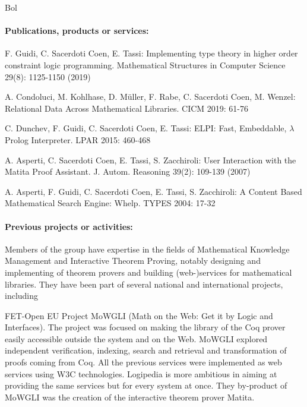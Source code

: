 \begin{sitedescription}{Bol}
\paragraph*{Publications, products or services:}

\begin{compactitem}
\item F. Guidi, C. Sacerdoti Coen, E. Tassi:
Implementing type theory in higher order constraint logic programming. Mathematical Structures in Computer Science 29(8): 1125-1150 (2019)
\item A. Condoluci, M. Kohlhase, D. Müller, F. Rabe, C. Sacerdoti Coen, M. Wenzel: Relational Data Across Mathematical Libraries. CICM 2019: 61-76
\item C. Dunchev, F. Guidi, C. Sacerdoti Coen, E. Tassi:
ELPI: Fast, Embeddable, $\lambda$Prolog Interpreter. LPAR 2015: 460-468
\item A. Asperti, C. Sacerdoti Coen, E. Tassi, S. Zacchiroli:
User Interaction with the Matita Proof Assistant. J. Autom. Reasoning 39(2): 109-139 (2007)
\item A. Asperti, F. Guidi, C. Sacerdoti Coen, E. Tassi, S. Zacchiroli:
A Content Based Mathematical Search Engine: Whelp. TYPES 2004: 17-32
\end{compactitem}

\paragraph*{Previous projects or activities:}

Members of the group have expertise in the fields of Mathematical Knowledge Management and Interactive Theorem Proving, notably designing and implementing of theorem provers and building (web-)services for mathematical libraries.
They have been part of several national and international projects, including

\begin{compactitem}
\item FET-Open EU Project MoWGLI (Math on the Web: Get it by Logic and Interfaces). The project was focused on making the library of the Coq prover easily accessible outside the system and on the Web. MoWGLI explored independent verification, indexing, search and retrieval and transformation of proofs coming from Coq. All the previous services were implemented as web services using W3C technologies. Logipedia is more ambitious in aiming at providing the same services but for every system at once. They by-product of MoWGLI was the creation of the interactive theorem prover Matita.


\end{compactitem}
\end{sitedescription}
